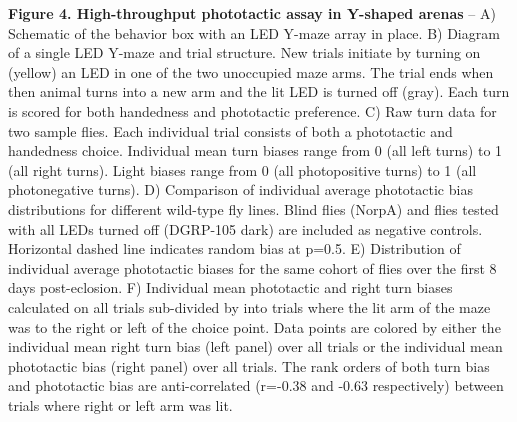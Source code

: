 \documentclass[10pt,letterpaper]{article}
\begin{document}
\clearpage
\textbf{Figure 4. High-throughput phototactic assay in Y-shaped arenas} -- A) Schematic of the behavior box with an LED Y-maze array in place. B) Diagram of a single LED Y-maze and trial structure. New trials initiate by turning on (yellow) an LED in one of the two unoccupied maze arms. The trial ends when then animal turns into a new arm and the lit LED is turned off (gray). Each turn is scored for both handedness and phototactic preference. C) Raw turn data for two sample flies. Each individual trial consists of both a phototactic and handedness choice. Individual mean turn biases range from 0 (all left turns) to 1 (all right turns). Light biases range from 0 (all photopositive turns) to 1 (all photonegative turns). D) Comparison of individual average phototactic bias distributions for different wild-type fly lines. Blind flies (NorpA) and flies tested with all LEDs turned off (DGRP-105 dark) are included as negative controls. Horizontal dashed line indicates random bias at p=0.5. E) Distribution of individual average phototactic biases for the same cohort of flies over the first 8 days post-eclosion. F) Individual mean phototactic and right turn biases calculated on all trials sub-divided by into trials where the lit arm of the maze was to the right or left of the choice point. Data points are colored by either the individual mean right turn bias (left panel) over all trials or the individual mean phototactic bias (right panel) over all trials. The rank orders of both turn bias and phototactic bias are anti-correlated (r=-0.38 and -0.63 respectively) between trials where right or left arm was lit.
\end{document}
